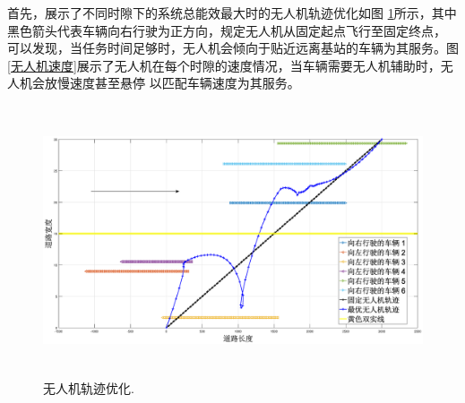 首先，展示了不同时隙下的系统总能效最大时的无人机轨迹优化如图 \ref{无人机轨迹优化}所示，其中黑色箭头代表车辆向右行驶为正方向，规定无人机从固定起点飞行至固定终点，
可以发现，当任务时间足够时，无人机会倾向于贴近远离基站的车辆为其服务。图 \ref{无人机速度}展示了无人机在每个时隙的速度情况，当车辆需要无人机辅助时，无人机会放慢速度甚至悬停
以匹配车辆速度为其服务。

\begin{figure}[H]
\centering
\includegraphics[width=16cm,height=8cm]{figures//chap4//小轨迹.eps}   %
\caption{无人机轨迹优化.}
\label{无人机轨迹优化}
\end{figure}

